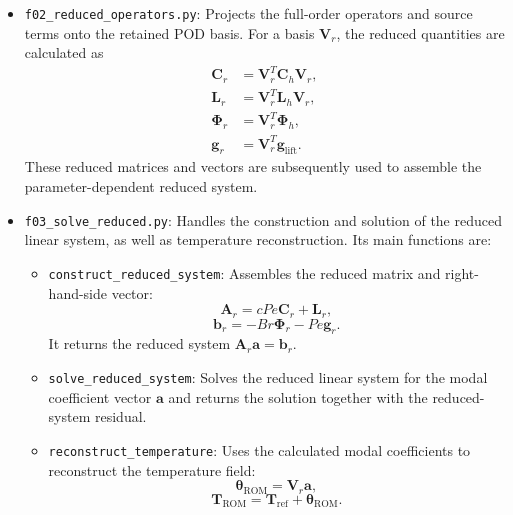\begin{itemize}
\begin{itemize}
        \item \texttt{build\_operator\_components}: Collects
        the operator matrices, viscous-dissipation source,
        and lifting contribution. It is the main interface
        for constructing the full-order components required
        by the reduced model.
    \end{itemize}

    \item \texttt{f02\_reduced\_operators.py}: Projects the
    full-order operators and source terms onto the retained
    POD basis. For a basis $\mathbf{V}_r$, the reduced
    quantities are calculated as
    \begin{align*}
        \mathbf{C}_r
        &=\mathbf{V}_r^T\mathbf{C}_h\mathbf{V}_r,\\
        \mathbf{L}_r
        &=\mathbf{V}_r^T\mathbf{L}_h\mathbf{V}_r,\\
        \boldsymbol{\Phi}_r
        &=\mathbf{V}_r^T\boldsymbol{\Phi}_h,\\
        \mathbf{g}_r
        &=\mathbf{V}_r^T\mathbf{g}_{\mathrm{lift}}.
    \end{align*}
    These reduced matrices and vectors are subsequently
    used to assemble the parameter-dependent reduced system.

    \item \texttt{f03\_solve\_reduced.py}: Handles the
    construction and solution of the reduced linear system,
    as well as temperature reconstruction. Its main functions
    are:

    \begin{itemize}
        \item \texttt{construct\_reduced\_system}: Assembles
        the reduced matrix and right-hand-side vector:
        \[
            \mathbf{A}_r
            =
            cPe\mathbf{C}_r+\mathbf{L}_r,
        \]
        \[
            \mathbf{b}_r
            =
            -Br\boldsymbol{\Phi}_r-Pe\mathbf{g}_r.
        \]
        It returns the reduced system
        $\mathbf{A}_r\mathbf{a}=\mathbf{b}_r$.

        \item \texttt{solve\_reduced\_system}: Solves the
        reduced linear system for the modal coefficient
        vector $\mathbf{a}$ and returns the solution
        together with the reduced-system residual.

        \item \texttt{reconstruct\_temperature}: Uses the
        calculated modal coefficients to reconstruct the
        temperature field:
        \[
            \boldsymbol{\theta}_{\mathrm{ROM}}
            =\mathbf{V}_r\mathbf{a},
        \]
        \[
            \mathbf{T}_{\mathrm{ROM}}
            =
            \mathbf{T}_{\mathrm{ref}}
            +\boldsymbol{\theta}_{\mathrm{ROM}}.
        \]


\end{itemize}
\end{itemize}
